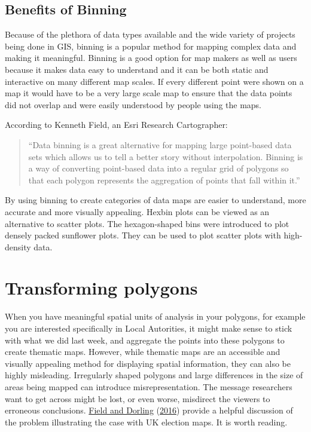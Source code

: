 \documentclass[
]{book}
\begin{document}
\hypertarget{benefits-of-binning}{%
\subsection{Benefits of Binning}\label{benefits-of-binning}}

Because of the plethora of data types available and the wide variety of projects being done in GIS, binning is a popular method for mapping complex data and making it meaningful. Binning is a good option for map makers as well as users because it makes data easy to understand and it can be both static and interactive on many different map scales. If every different point were shown on a map it would have to be a very large scale map to ensure that the data points did not overlap and were easily understood by people using the maps.

According to Kenneth Field, an Esri Research Cartographer:

\begin{quote}
``Data binning is a great alternative for mapping large point-based data sets which allows us to tell a better story without interpolation. Binning is a way of converting point-based data into a regular grid of polygons so that each polygon represents the aggregation of points that fall within it.''
\end{quote}

By using binning to create categories of data maps are easier to understand, more accurate and more visually appealing. Hexbin plots can be viewed as an alternative to scatter plots. The hexagon-shaped bins were introduced to plot densely packed sunflower plots. They can be used to plot scatter plots with high-density data.

\hypertarget{transforming-polygons}{%
\section{Transforming polygons}\label{transforming-polygons}}

When you have meaningful spatial units of analysis in your polygons, for example you are interested specifically in Local Autorities, it might make sense to stick with what we did last week, and aggregate the points into these polygons to create thematic maps. However, while thematic maps are an accessible and visually appealing method for displaying spatial information, they can also be highly misleading. Irregularly shaped polygons and large differences in the size of areas being mapped can introduce misrepresentation. The message researchers want to get across might be lost, or even worse, misdirect the viewers to erroneous conclusions. \protect\hyperlink{ref-Field_2016}{Field and Dorling} (\protect\hyperlink{ref-Field_2016}{2016}) provide a helpful discussion of the problem illustrating the case with UK election maps. It is worth reading.
\end{document}
